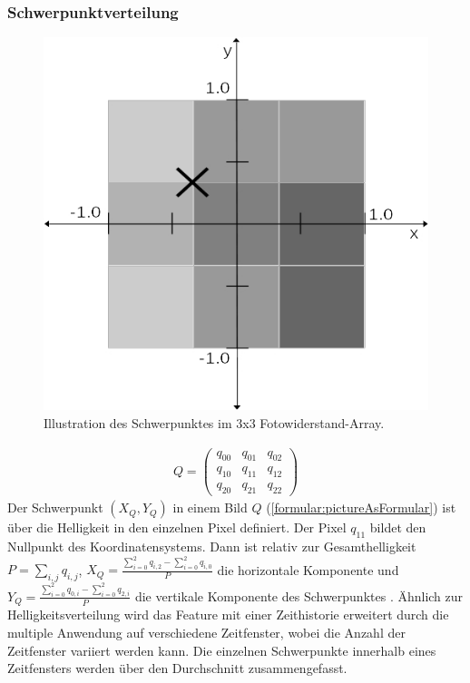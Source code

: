 \subsubsection{Schwerpunktverteilung}
\label{sec:schwerpunktverteilung}
\begin{figure}
    \centering
    \includegraphics[width=0.5\linewidth]{images/schwerpunkt_ansatz.jpg}
    \caption{Illustration des Schwerpunktes im 3x3 Fotowiderstand-Array.}
    \label{fig:schwerpunkt}
\end{figure}
\begin{align}
    Q = \begin{pmatrix}
            q_{00} & q_{01} & q_{02} \\
            q_{10} & q_{11} & q_{12} \\
            q_{20} & q_{21} & q_{22}
    \end{pmatrix}
    \label{formular:pictureAsFormular}
\end{align}
Der Schwerpunkt $(X_Q, Y_Q)$ in einem Bild $Q$ (\ref{formular:pictureAsFormular}) ist über die Helligkeit in den einzelnen Pixel definiert. Der Pixel $q_{11}$ bildet den Nullpunkt des Koordinatensystems.
Dann ist relativ zur Gesamthelligkeit $P = \sum_{i,j} q_{i,j}$, $X_Q=\frac{\sum_{i=0}^{2} q_{i,2} - \sum_{i=0}^{2} q_{i,0}}{P}$ die horizontale Komponente
und $Y_Q = \frac{\sum_{i=0}^{2} q_{0,i} - \sum_{i=0}^{2} q_{2,i}}{P}$ die vertikale Komponente des Schwerpunktes \cite{schwerpunktAnsatz}.
\newline
\newline
Ähnlich zur Helligkeitsverteilung wird das Feature mit einer Zeithistorie erweitert durch die multiple Anwendung auf verschiedene Zeitfenster, wobei die Anzahl der Zeitfenster variiert werden kann. Die
einzelnen Schwerpunkte innerhalb eines Zeitfensters werden über den Durchschnitt zusammengefasst.
\newline
\newline
